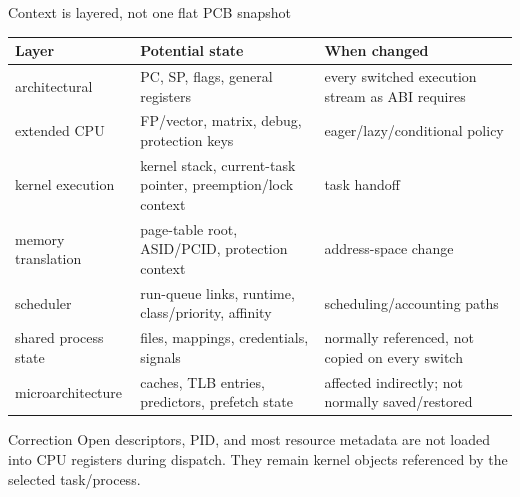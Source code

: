 \documentclass[aspectratio=169,11pt]{beamer}
\begin{document}
\begin{frame}{Context is layered, not one flat PCB snapshot}
  \scriptsize
  \begin{tabularx}{\textwidth}{@{}lXX@{}}
    \toprule
    \textbf{Layer} & \textbf{Potential state} & \textbf{When changed} \\
    \midrule
    architectural & PC, SP, flags, general registers & every switched execution stream as ABI requires \\
    extended CPU & FP/vector, matrix, debug, protection keys & eager/lazy/conditional policy \\
    kernel execution & kernel stack, current-task pointer, preemption/lock context & task handoff \\
    memory translation & page-table root, ASID/PCID, protection context & address-space change \\
    scheduler & run-queue links, runtime, class/priority, affinity & scheduling/accounting paths \\
    shared process state & files, mappings, credentials, signals & normally referenced, not copied on every switch \\
    microarchitecture & caches, TLB entries, predictors, prefetch state & affected indirectly; not normally saved/restored \\
    \bottomrule
  \end{tabularx}
  \begin{alertblock}{Correction}
    Open descriptors, PID, and most resource metadata are not loaded into CPU registers during dispatch. They remain kernel objects referenced by the selected task/process.
  \end{alertblock}
\end{frame}
\end{document}

